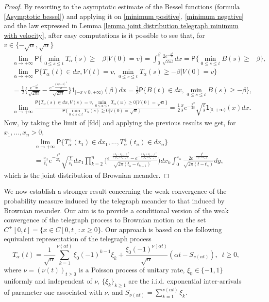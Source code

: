 \documentclass{article}
\theoremstyle{definition}
\numberwithin{equation}{section}
\begin{document}
\begin{proof}
By resorting to the asymptotic estimate of the Bessel functions (formula \eqref{Asymptotic bessel}) and applying it on \eqref{minimum positive}, \eqref{minimum negative} and the law expressed in Lemma \ref{lemma joint distribution telegraph minimum with velocity}, after easy computations is it possible to see that, for $v \in \{-\sqrt{\alpha},\sqrt{\alpha}\}$
\begin{align}
&\lim_{\alpha \to +\infty}\mathsf{P}\{\min_{0\leq s \leq t}T_\alpha(s) \geq -\beta|V(0) = v\} = \int_0^\beta\frac{2e^{-\frac{x^2}{2t}}}{\sqrt{2\pi t}}dx = \mathsf{P}\{\min_{0\leq s \leq t}B(s) \geq -\beta\},\\
&\lim_{\alpha \to +\infty}\mathsf{P}\{T_\alpha(t) \in dx,V(t) = v,\min_{0\leq s \leq t}T_\alpha(s) \geq -\beta|V(0) = v\} \nonumber\\&=\frac{1}{2}\bigg\{\frac{e^{-\frac{x^2}{2t}}}{\sqrt{2\pi t}}-\frac{e^{-\frac{(2\beta+x)^2}{2t}}}{\sqrt{2\pi t}}\bigg\}\mathsf{1}_{[-x\lor 0,+\infty)}(\beta)dx =\frac{1}{2}\mathsf{P}\{B(t) \in dx,\min_{0\leq s\leq t}B(s)\geq -\beta\},\\
&\lim_{\alpha \to +\infty}\frac{\mathsf{P}\{T_\alpha(s) \in dx,V(s) = v,\min_{0\leq u \leq s}T_\alpha(u) \geq 0|V(0) = \sqrt{\alpha}\}}{\mathsf{P}\{\min_{0\leq s \leq t}T_\alpha(s) \geq 0|V(0) = \sqrt{\alpha}\}} = \frac{1}{2}\frac{x}{s}e^{-\frac{x^2}{2s}}\sqrt{\frac{t}{s}}\mathsf{1}_{[0,+\infty)}(x)dx.
\end{align}
Now, by taking the limit of \eqref{fdd} and applying the previous results we get, for $x_1,...,x_n>0$,
\begin{align*}
&\lim_{\alpha \to +\infty}\mathsf{P}\{T^{+}_\alpha(t_1) \in dx_1,...,T^{+}_\alpha(t_n) \in dx_n\} \\
&= \frac{x_1}{t_1}e^{-\frac{x_1^2}{2t_1}}\sqrt{\frac{t}{s_1}}dx_1\prod_{k=2}^n\big(\frac{e^{-\frac{(x_{k}-x_{k-1})^2}{2(t_k-t_{k-1})}}-e^{-\frac{(x_{k}+x_{k-1})^2}{2(t_k-t_{k-1})}}}{\sqrt{2\pi(t_k-t_{k-1})}}\big)dx_k\int_{0}^{x_n}\frac{2e^{-\frac{y^2}{2(t-t_n)}}}{\sqrt{2\pi(t-t_n)}}dy,
\end{align*}
which is the joint distribution of Brownian meander. 
\end{proof}
We now establish a stronger result concerning the weak convergence of the probability measure induced by the telegraph meander to that induced by Brownian meander. Our aim is to provide a conditional version of the weak convergence of the telegraph process to Brownian motion on the set $C^+[0,t]= \{x \in C[0,t]: x\geq 0\}$. Our approach is based on the following equivalent representation of the telegraph process
\begin{equation}\label{Telegraph process definiton 2}
T_\alpha(t) = \frac{1}{\sqrt{\alpha}}\sum_{k = 1}^{\nu(\alpha t)}\xi_0(-1)^{k-1}\xi_k+\frac{\xi_0(-1)^{\nu(\alpha t)}}{\sqrt{\alpha}}(\alpha t-S_{\nu(\alpha t)}), \;\; t \geq 0,
\end{equation}
where $\nu = (\nu(t))_{t \geq 0}$ is a Poisson process of unitary rate, $\xi_0 \in \{-1,1\}$ uniformly and independent of $\nu$, $\{\xi_k\}_{k \geq 1}$ are the i.i.d. exponential inter-arrivals of parameter one associated with $\nu$, and $S_{\nu(\alpha t)} = \sum_{k=1}^{\nu(\alpha t)}\xi_k$. 
\end{document}
